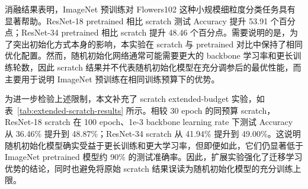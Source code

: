 \documentclass[UTF8]{ctexart}
\begin{document}
消融结果表明，ImageNet 预训练对 Flowers102 这种小规模细粒度分类任务具有显著帮助。ResNet-18 pretrained 相比 scratch 测试 Accuracy 提升 53.91 个百分点；ResNet-34 pretrained 相比 scratch 提升 48.46 个百分点。需要说明的是，为了突出初始化方式本身的影响，本实验在 scratch 与 pretrained 对比中保持了相同优化配置。然而，随机初始化网络通常可能需要更大的 backbone 学习率和更长训练轮数，因此 scratch 结果并不代表随机初始化模型在充分调参后的最优性能，而主要用于说明 ImageNet 预训练在相同训练预算下的优势。

为进一步检验上述限制，本文补充了 scratch extended-budget 实验，如表~\ref{tab:extended-scratch-results} 所示。相较 30 epoch 的同预算 scratch，ResNet-18 scratch 在 100 epoch、1e-3 backbone learning rate 下测试 Accuracy 从 36.46\% 提升到 48.87\%；ResNet-34 scratch 从 41.94\% 提升到 49.00\%。这说明随机初始化模型确实受益于更长训练和更大学习率，但即便如此，它们仍显著低于 ImageNet pretrained 模型约 90\% 的测试准确率。因此，扩展实验强化了迁移学习优势的结论，同时也避免将原始 scratch 结果误读为随机初始化模型的充分训练上限。

\begin{table}[H]
\centering
\caption{Scratch extended-budget 实验结果}
\label{tab:extended-scratch-results}
\end{table}
\end{document}
